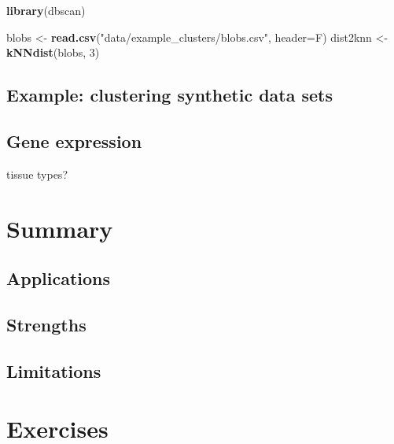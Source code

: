 \documentclass[]{book}
\newenvironment{Shaded}{\begin{snugshade}}{\end{snugshade}}
\newcommand{\KeywordTok}[1]{\textcolor[rgb]{0.13,0.29,0.53}{\textbf{{#1}}}}
\newcommand{\DataTypeTok}[1]{\textcolor[rgb]{0.13,0.29,0.53}{{#1}}}
\newcommand{\DecValTok}[1]{\textcolor[rgb]{0.00,0.00,0.81}{{#1}}}
\newcommand{\StringTok}[1]{\textcolor[rgb]{0.31,0.60,0.02}{{#1}}}
\newcommand{\NormalTok}[1]{{#1}}
\theoremstyle{definition}
\theoremstyle{definition}
\theoremstyle{definition}
\theoremstyle{remark}
\begin{document}
\begin{Shaded}
\begin{Highlighting}[]
\KeywordTok{library}\NormalTok{(dbscan)}
\end{Highlighting}
\end{Shaded}

\begin{Shaded}
\begin{Highlighting}[]
\NormalTok{blobs <-}\StringTok{ }\KeywordTok{read.csv}\NormalTok{(}\StringTok{"data/example_clusters/blobs.csv"}\NormalTok{, }\DataTypeTok{header=}\NormalTok{F)}
\NormalTok{dist2knn <-}\StringTok{ }\KeywordTok{kNNdist}\NormalTok{(blobs, }\DecValTok{3}\NormalTok{)}
\end{Highlighting}
\end{Shaded}

\subsection{Example: clustering synthetic data
sets}\label{example-clustering-synthetic-data-sets-2}

\subsection{Gene expression}\label{gene-expression}

tissue types?

\section{Summary}\label{summary}

\subsection{Applications}\label{applications}

\subsection{Strengths}\label{strengths}

\subsection{Limitations}\label{limitations}

\section{Exercises}\label{exercises-7}
\end{document}

